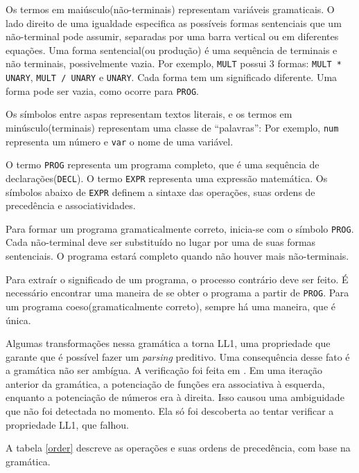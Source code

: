 Os termos em maiúsculo(não-terminais) representam variáveis gramaticais.
O lado direito de uma igualdade especifica as possíveis formas sentenciais
que um não-terminal pode assumir,
separadas por uma barra vertical ou em diferentes equações.
Uma forma sentencial(ou produção) é uma sequência de terminais e não terminais, possivelmente vazia.
Por exemplo, \texttt{MULT} possui 3 formas:
\texttt{MULT * UNARY}, \texttt{MULT / UNARY} e \texttt{UNARY}.
Cada forma tem um significado diferente.
Uma forma pode ser vazia, como ocorre para \texttt{PROG}.

Os símbolos entre aspas representam textos literais,
e os termos em minúsculo(terminais) representam uma classe de ``palavras'':
Por exemplo, \texttt{num} representa um número e \texttt{var} o nome de uma variável.

O termo \texttt{PROG} representa um programa completo,
que é uma sequência de declarações(\texttt{DECL}).
O termo \texttt{EXPR} representa uma expressão matemática.
Os símbolos abaixo de \texttt{EXPR} definem a sintaxe das operações,
suas ordens de precedência e associatividades.

Para formar um programa gramaticalmente correto, inicia-se com o símbolo \texttt{PROG}.
Cada não-terminal deve ser substituído no lugar por uma de suas formas sentenciais.
O programa estará completo quando não houver mais não-terminais.

Para extraír o significado de um programa, o processo contrário deve ser feito.
É necessário encontrar uma maneira de se obter o programa a partir de \texttt{PROG}.
Para um programa coeso(gramaticalmente correto), sempre há uma maneira, que é única.

Algumas transformações nessa gramática a torna LL1,
uma propriedade que garante que é possível fazer um \textit{parsing} preditivo.
Uma consequência desse fato é a gramática não ser ambígua.
A verificação foi feita em \cite{GramCheck}.
Em uma iteração anterior da gramática, a potenciação de funções era associativa à esquerda,
enquanto a potenciação de números era à direita.
Isso causou uma ambiguidade que não foi detectada no momento.
Ela só foi descoberta ao tentar verificar a propriedade LL1, que falhou.


A tabela \ref{order} descreve as operações e suas ordens de precedência, com base na gramática.

